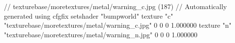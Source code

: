 // texturebase/moretextures/metal/warning_c.jpg (187)
// Automatically generated using cfgfix
setshader "bumpworld"
texture "c" "texturebase/moretextures/metal/warning_c.jpg" 0 0 0 1.000000
texture "n" "texturebase/moretextures/metal/warning_n.jpg" 0 0 0 1.000000
